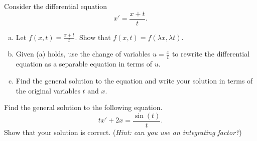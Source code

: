 \documentclass[12pt]{article} %
\begin{document}
\begin{problem}
Consider the differential equation
\[
x'=\frac{x+t}{t}.
\]
\begin{enumerate}[(a)]
    \item Let $f(x,t)=\frac{x+t}{t}$. Show that $f(x,t)=f(\lambda x, \lambda t)$.
    \item Given (a) holds, use the change of variables $u=\frac{x}{t}$ to rewrite the differential equation as a separable equation in terms of $u$.
    \item Find the general solution to the equation and write your solution in terms of the original variables $t$ and $x$.
\end{enumerate}
\end{problem}

\begin{problem}
Find the general solution to the following equation.
\[
tx'+2x=\frac{\sin(t)}{t}.
\]
Show that your solution is correct. (\emph{Hint: can you use an integrating factor?})
\end{problem}
\end{document}
